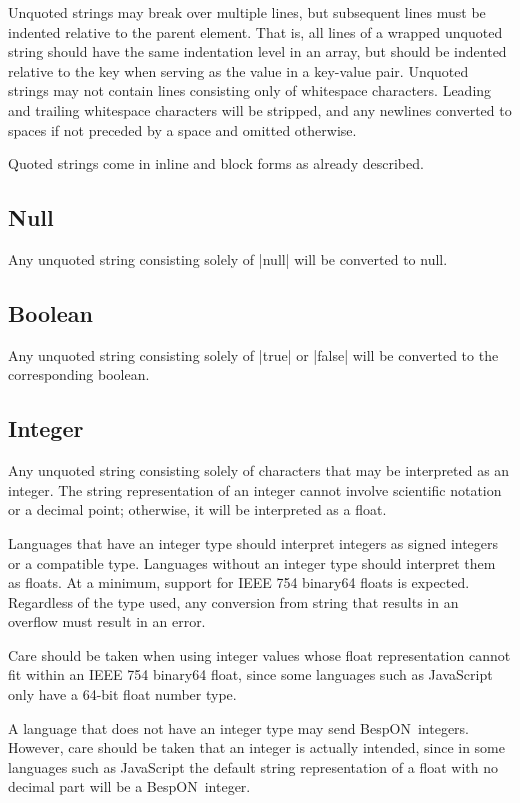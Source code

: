 \documentclass[11pt]{article}
\newcommand{\bespon}{BespON}
\begin{document}
Unquoted strings may break over multiple lines, but subsequent lines must be indented relative to the parent element.  That is, all lines of a wrapped unquoted string should have the same indentation level in an array, but should be indented relative to the key when serving as the value in a key-value pair.  Unquoted strings may not contain lines consisting only of whitespace characters.  Leading and trailing whitespace characters will be stripped, and any newlines converted to spaces if not preceded by a space and omitted otherwise.

Quoted strings come in inline and block forms as already described.


\subsection{Null}

Any unquoted string consisting solely of |null| will be converted to null.


\subsection{Boolean}

Any unquoted string consisting solely of |true| or |false| will be converted to the corresponding boolean.


\subsection{Integer}

Any unquoted string consisting solely of characters that may be interpreted as an integer.  The string representation of an integer cannot involve scientific notation or a decimal point; otherwise, it will be interpreted as a float.

Languages that have an integer type should interpret integers as signed integers or a compatible type.  Languages without an integer type should interpret them as floats.  At a minimum, support for IEEE 754 binary64 floats is expected.  Regardless of the type used, any conversion from string that results in an overflow must result in an error.

Care should be taken when using integer values whose float representation cannot fit within an IEEE 754 binary64 float, since some languages such as JavaScript only have a 64-bit float number type.

A language that does not have an integer type may send \bespon\ integers.  However, care should be taken that an integer is actually intended, since in some languages such as JavaScript the default string representation of a float with no decimal part will be a \bespon\ integer.
\end{document}
